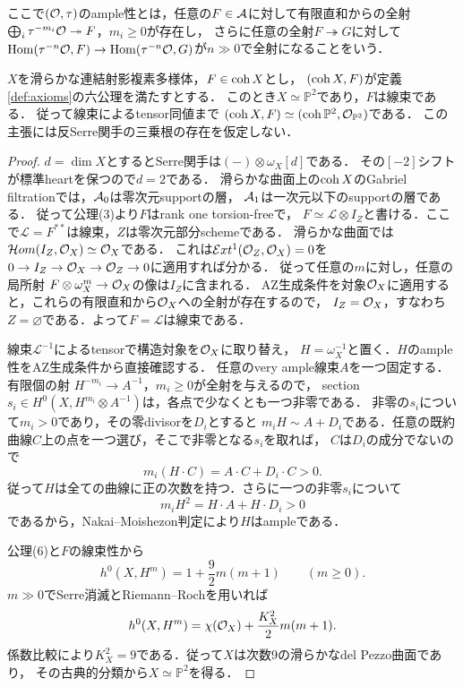 \documentclass[11pt,a4paper]{ltjsarticle}
\begin{document}
ここで$(\mathcal O,\tau)$のample性とは，任意の$F\in\mathcal A$に対して有限直和からの全射
$\bigoplus_i\tau^{-m_i}\mathcal O\twoheadrightarrow F$，$m_i\geq0$が存在し，
さらに任意の全射$F\twoheadrightarrow G$に対して
$\operatorname{Hom}(\tau^{-n}\mathcal O,F)\to\operatorname{Hom}(\tau^{-n}\mathcal O,G)$が$n\gg0$で全射になることをいう．

\begin{proposition}[可換な特殊化の認識]\label{prop:v9-commutative-specialization}
$X$を滑らかな連結射影複素多様体，$F\in\operatorname{coh} X$とし，
$(\operatorname{coh} X,F)$が定義\ref{def:axioms}の六公理を満たすとする．
このとき$X\simeq\mathbb P^2$であり，$F$は線束である．
従って線束によるtensor同値まで
$(\operatorname{coh} X,F)\simeq(\operatorname{coh}\mathbb P^2,\mathcal O_{\mathbb P^2})$である．
この主張には反Serre関手の三乗根の存在を仮定しない．
\end{proposition}
\begin{proof}
$d=\dim X$とするとSerre関手は$(-)\otimes\omega_X[d]$である．
その$[-2]$シフトが標準heartを保つので$d=2$である．
滑らかな曲面上の$\operatorname{coh} X$のGabriel filtrationでは，$\mathcal A_0$は零次元supportの層，
$\mathcal A_1$は一次元以下のsupportの層である．
従って公理(3)より$F$はrank one torsion-freeで，
$F\simeq\mathcal L\otimes I_Z$と書ける．ここで$\mathcal L=F^{**}$は線束，$Z$は零次元部分schemeである．
滑らかな曲面では$\mathcal Hom(I_Z,\mathcal O_X)\simeq\mathcal O_X$である．
これは$\mathcal Ext^1(\mathcal O_Z,\mathcal O_X)=0$を
$0\to I_Z\to\mathcal O_X\to\mathcal O_Z\to0$に適用すれば分かる．
従って任意の$m$に対し，任意の局所射
$F\otimes\omega_X^m\to\mathcal O_X$の像は$I_Z$に含まれる．
AZ生成条件を対象$\mathcal O_X$に適用すると，これらの有限直和から$\mathcal O_X$への全射が存在するので，
$I_Z=\mathcal O_X$，すなわち$Z=\varnothing$である．よって$F=\mathcal L$は線束である．

線束$\mathcal L^{-1}$によるtensorで構造対象を$\mathcal O_X$に取り替え，
$H=\omega_X^{-1}$と置く．$H$のample性をAZ生成条件から直接確認する．
任意のvery ample線束$A$を一つ固定する．有限個の射
$H^{-m_i}\to A^{-1}$，$m_i\geq0$が全射を与えるので，
section $s_i\in H^0(X,H^{m_i}\otimes A^{-1})$は，各点で少なくとも一つ非零である．
非零の$s_i$について$m_i>0$であり，その零divisorを$D_i$とすると
$m_iH\sim A+D_i$である．任意の既約曲線$C$上の点を一つ選び，そこで非零となる$s_i$を取れば，
$C$は$D_i$の成分でないので
\[
 m_i(H\cdot C)=A\cdot C+D_i\cdot C>0.
\]
従って$H$は全ての曲線に正の次数を持つ．さらに一つの非零$s_i$について
\[
 m_i H^2=H\cdot A+H\cdot D_i>0
\]
であるから，Nakai--Moishezon判定により$H$はampleである．

公理(6)と$F$の線束性から
\[
 h^0(X,H^m)=1+\frac92m(m+1)\qquad(m\geq0).
\]
$m\gg0$でSerre消滅とRiemann--Rochを用いれば
\[
 h^0(X,H^m)=\chi(\mathcal O_X)+\frac{K_X^2}{2}m(m+1).
\]
係数比較により$K_X^2=9$である．従って$X$は次数9の滑らかなdel Pezzo曲面であり，
その古典的分類\cite[\S2.1, \S3.1.1]{DolgachevMartin}から$X\simeq\mathbb P^2$を得る．
\end{proof}
\end{document}
